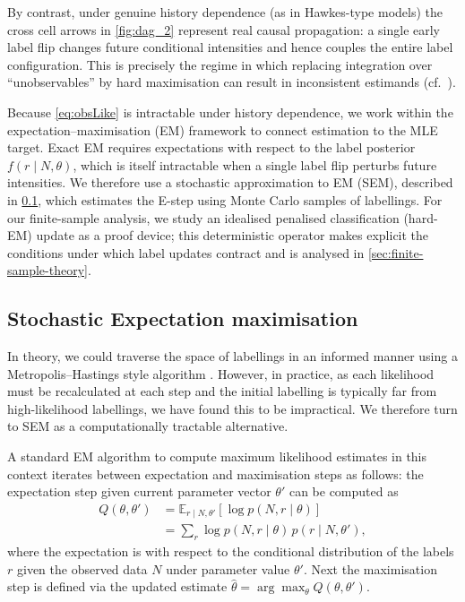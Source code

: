 \documentclass{statsoc}
\newcommand{\bbE}{\mathbb{E}}
\newcommand{\1}{\mathbbm{1}}
\newcommand{\Nproc}{N}
\begin{document}
By contrast, under genuine history dependence (as in Hawkes-type models) the cross cell arrows in \cref{fig:dag_2} represent real causal propagation: a single early label flip changes future conditional intensities and hence couples the entire label configuration. This is precisely the regime in which replacing integration over ``unobservables'' by hard maximisation can result in inconsistent estimands (cf.\ \citet{meng2010s}). 

Because \eqref{eq:obsLike} is intractable under history dependence, we work within the expectation--maximisation (EM) framework to connect estimation to the MLE target. Exact EM requires expectations with respect to the label posterior \(f(r\mid \Nproc,\theta)\), which is itself intractable when a single label flip perturbs future intensities. We therefore use a stochastic approximation to EM (SEM), described in \cref{sec:stochEM}, which estimates the E-step using Monte Carlo samples of labellings. For our finite-sample analysis, we study an idealised penalised classification (hard-EM) update as a proof device; this deterministic operator makes explicit the conditions under which label updates contract and is analysed in \cref{sec:finite-sample-theory}.

\subsection{Stochastic Expectation maximisation}\label{sec:stochEM}



In theory, we could traverse the space of labellings in an informed manner using a Metropolis--Hastings style algorithm \citep{metropolis_1953}. However, in practice, as each likelihood must be recalculated at each step and the initial labelling is typically far from high-likelihood labellings, we have found this to be impractical. We therefore turn to SEM as a computationally tractable alternative.

A standard EM algorithm to compute maximum likelihood estimates in this context iterates between expectation and maximisation steps as follows: the expectation step given current parameter vector $\theta'$ can be computed as
	\begin{align}
	Q(\theta,\theta') 
	&= \bbE_{r \mid N, \theta'}\!\left[ \log p(N,r \mid \theta)\right] \nonumber \\
	&= \sum_{r} \log p(N,r \mid \theta)\, p(r \mid N, \theta') , \label{eq:Q}
	\end{align}
	where the expectation is with respect to the conditional distribution of the labels $r$ given the observed data $N$ under parameter value $\theta'$.
	Next the maximisation step is defined via the updated estimate
	\(
	\hat\theta = \arg\max_\theta Q(\theta,\theta').
	\)
    
\end{document}

